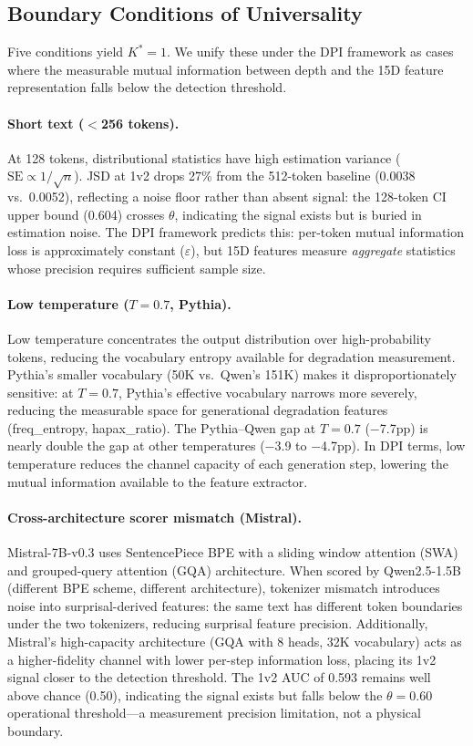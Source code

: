 \documentclass[11pt]{article}
\newcommand{\kstar}{K^{*}}
\newcommand{\thetaval}{\theta}
\begin{document}
\subsection{Boundary Conditions of Universality}
\label{sec:boundary}

Five conditions yield $\kstar = 1$. We unify these under the DPI framework as cases where the measurable mutual information between depth and the 15D feature representation falls below the detection threshold.

\paragraph{Short text ($<$256 tokens).} At 128 tokens, distributional statistics have high estimation variance ($\text{SE} \propto 1/\sqrt{n}$). JSD at 1v2 drops 27\% from the 512-token baseline (0.0038 vs.\ 0.0052), reflecting a noise floor rather than absent signal: the 128-token CI upper bound (0.604) crosses $\thetaval$, indicating the signal exists but is buried in estimation noise. The DPI framework predicts this: per-token mutual information loss is approximately constant ($\varepsilon$), but 15D features measure \emph{aggregate} statistics whose precision requires sufficient sample size.

\paragraph{Low temperature ($T = 0.7$, Pythia).} Low temperature concentrates the output distribution over high-probability tokens, reducing the vocabulary entropy available for degradation measurement. Pythia's smaller vocabulary (50K vs.\ Qwen's 151K) makes it disproportionately sensitive: at $T = 0.7$, Pythia's effective vocabulary narrows more severely, reducing the measurable space for generational degradation features (freq\_entropy, hapax\_ratio). The Pythia--Qwen gap at $T = 0.7$ ($-$7.7pp) is nearly double the gap at other temperatures ($-$3.9 to $-$4.7pp). In DPI terms, low temperature reduces the channel capacity of each generation step, lowering the mutual information available to the feature extractor.

\paragraph{Cross-architecture scorer mismatch (Mistral).} Mistral-7B-v0.3 uses SentencePiece BPE with a sliding window attention (SWA) and grouped-query attention (GQA) architecture. When scored by Qwen2.5-1.5B (different BPE scheme, different architecture), tokenizer mismatch introduces noise into surprisal-derived features: the same text has different token boundaries under the two tokenizers, reducing surprisal feature precision. Additionally, Mistral's high-capacity architecture (GQA with 8 heads, 32K vocabulary) acts as a higher-fidelity channel with lower per-step information loss, placing its 1v2 signal closer to the detection threshold. The 1v2 AUC of 0.593 remains well above chance (0.50), indicating the signal exists but falls below the $\thetaval = 0.60$ operational threshold---a measurement precision limitation, not a physical boundary.
\end{document}
